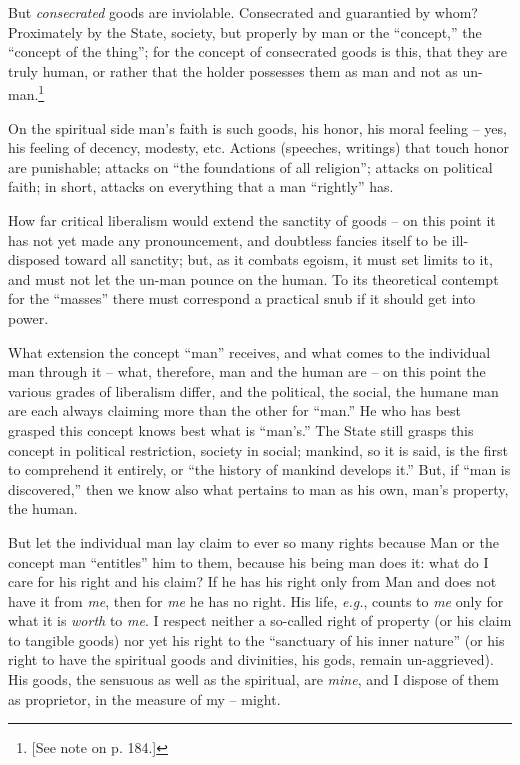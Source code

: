 But \textit{consecrated} goods are inviolable. Consecrated and guarantied by 
whom? Proximately by the State, society, but properly by man or the 
``concept,'' the ``concept of the thing''; for the concept of consecrated 
goods is this, that they are truly human, or rather that the holder possesses 
them as man and not as un-man.\footnote{[See note on p. 184.]}

On the spiritual side man's faith is such goods, his honor, his moral feeling 
-- yes, his feeling of decency, modesty, etc. Actions (speeches, writings) 
that touch honor are punishable; attacks on ``the foundations of all 
religion''; attacks on political faith; in short, attacks on everything that 
a man ``rightly'' has.

How far critical liberalism would extend the sanctity of goods -- on this 
point it has not yet made any pronouncement, and doubtless fancies itself to 
be ill-disposed toward all sanctity; but, as it combats egoism, it must set 
limits to it, and must not let the un-man pounce on the human. To its 
theoretical contempt for the ``masses'' there must correspond a practical 
snub if it should get into power.

What extension the concept ``man'' receives, and what comes to the 
individual man through it -- what, therefore, man and the human are -- on this 
point the various grades of liberalism differ, and the political, the social, 
the humane man are each always claiming more than the other for ``man.'' He 
who has best grasped this concept knows best what is ``man's.'' The State 
still grasps this concept in political restriction, society in social; 
mankind, so it is said, is the first to comprehend it entirely, or ``the 
history of mankind develops it.'' But, if ``man is discovered,'' then we 
know also what pertains to man as his own, man's property, the human.

But let the individual man lay claim to ever so many rights because Man or the 
concept man ``entitles'' him to them, because his being man does it: what do 
I care for his right and his claim? If he has his right only from Man and does 
not have it from \textit{me}, then for \textit{me} he has no right. His life, 
\textit{e.g.}, counts to \textit{me} only for what it is \textit{worth} to 
\textit{me}. I respect neither a so-called right of property (or his claim to 
tangible goods) nor yet his right to the ``sanctuary of his inner nature'' 
(or his right to have the spiritual goods and divinities, his gods, remain 
un-aggrieved). His goods, the sensuous as well as the spiritual, are 
\textit{mine}, and I dispose of them as proprietor, in the measure of my -- 
might.

